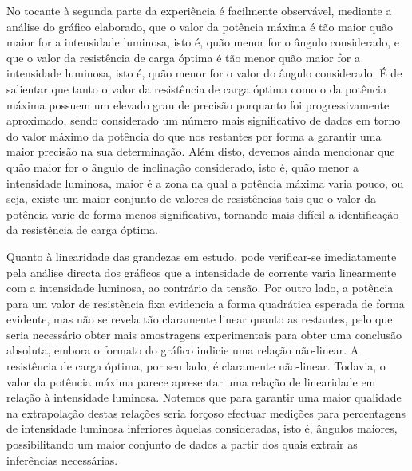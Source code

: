 \documentclass[10pt]{extarticle}
\begin{document}
\begin{multicols}{2}
\par No tocante à segunda parte da experiência é facilmente observável, mediante a análise do gráfico elaborado, que o valor da potência máxima é tão maior quão maior for a intensidade luminosa, isto é, quão menor for o ângulo considerado, e que o valor da resistência de carga óptima é tão menor quão maior for a intensidade luminosa, isto é, quão menor for o valor do ângulo considerado. É de salientar que tanto o valor da resistência de carga óptima como o da potência máxima possuem um elevado grau de precisão porquanto foi progressivamente aproximado, sendo considerado um número mais significativo de dados em torno do valor máximo da potência do que nos restantes por forma a garantir uma maior precisão na sua determinação. Além disto, devemos ainda mencionar que quão maior for o ângulo de inclinação considerado, isto é, quão menor a intensidade luminosa, maior é a zona na qual a potência máxima varia pouco, ou seja, existe um maior conjunto de valores de resistências tais que o valor da potência varie de forma menos significativa, tornando mais difícil a identificação da resistência de carga óptima.

\par Quanto à linearidade das grandezas em estudo, pode verificar-se imediatamente pela análise directa dos gráficos que a intensidade de corrente varia linearmente com a intensidade luminosa, ao contrário da tensão. Por outro lado, a potência para um valor de resistência fixa evidencia a forma quadrática esperada de forma evidente, mas não se revela tão claramente linear quanto as restantes, pelo que seria necessário obter mais amostragens experimentais para obter uma conclusão absoluta, embora o formato do gráfico indicie uma relação não-linear. A resistência de carga óptima, por seu lado, é claramente não-linear. Todavia, o valor da potência máxima parece apresentar uma relação de linearidade em relação à intensidade luminosa. Notemos que para garantir uma maior qualidade na extrapolação destas relações seria forçoso efectuar medições para percentagens de intensidade luminosa inferiores àquelas consideradas, isto é, ângulos maiores, possibilitando um maior conjunto de dados a partir dos quais extrair as inferências necessárias.


\end{multicols}
\end{document}
